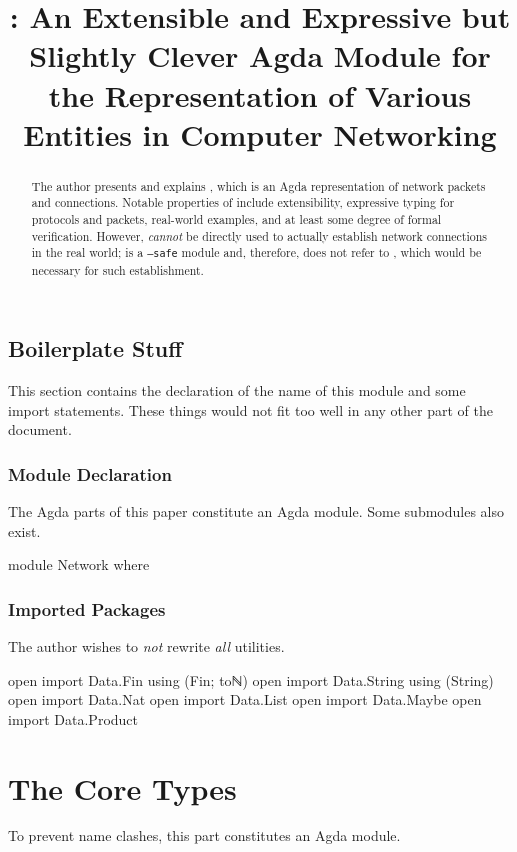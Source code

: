 \documentclass{report}
\title{\AgdaModule{Network}: An Extensible and Expressive but Slightly Clever Agda Module for the Representation of Various Entities in Computer Networking}
\begin{document}
\maketitle{}

\begin{abstract}
The author presents and explains , which is an Agda representation of network packets and connections.  Notable properties of  include extensibility, expressive typing for protocols and packets, real-world examples, and at least some degree of formal verification.  However,  \emph{cannot} be directly used to actually establish network connections in the real world;  is a \texttt{--safe} module and, therefore, does not refer to , which would be necessary for such establishment.
\end{abstract}

\chapter{Boilerplate Stuff}
This section contains the declaration of the name of this module and some import statements.  These things would not fit too well in any other part of the document.

\section{Module Declaration}
The Agda parts of this paper constitute an Agda module.  Some submodules also exist.

\begin{code}
module Network where
\end{code}

\section{Imported Packages}
The author wishes to \emph{not} rewrite \emph{all} utilities.

\begin{code}
open import Data.Fin using (Fin; toℕ)
open import Data.String using (String)
open import Data.Nat
open import Data.List
open import Data.Maybe
open import Data.Product
\end{code}

\part{The Core Types}
To prevent name clashes, this part constitutes an Agda module.
\end{document}
